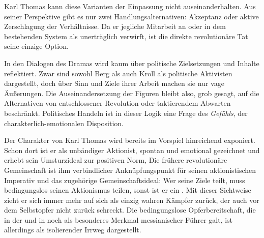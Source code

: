 Karl Thomas kann diese Varianten der Einpassung nicht
auseinanderhalten.  
Aus seiner Perspektive gibt es nur zwei Handlungsalternativen: Akzeptanz oder
aktive Zerschlagung der Verhältnisse. Da
er jegliche Mitarbeit an oder in dem bestehenden System als unerträglich
verwirft, ist die direkte revolutionäre Tat seine einzige Option.

In den Dialogen des Dramas wird kaum über politische Zielsetzungen und Inhalte
reflektiert. Zwar sind sowohl Berg als auch Kroll als politische Aktivisten
dargestellt, doch über Sinn und Ziele ihrer Arbeit machen sie nur vage
Äußerungen.
Die Auseinandersetzung der Figuren bleibt
also, grob gesagt, auf die Alternativen von entschlossener Revolution oder
taktierendem Abwarten beschränkt. Politisches Handeln ist in dieser Logik eine
Frage des \emph{Gefühls}, der charakterlich-emotionalen
Disposition.

Der Charakter von Karl Thomas wird bereits im Vorspiel hinreichend
exponiert. Schon dort ist er als unbändiger Aktionist, spontan und emotional
gezeichnet
und erhebt sein Umsturzideal zur positiven Norm,  
Die frühere revolutionäre Gemeinschaft ist ihm verbindlicher
Anknüpfungspunkt für seinen aktionistischen Imperativ und das
zugehörige Gemeinschaftsideal: Wer seine Ziele teilt, muss
bedingungslos seinen Aktionismus teilen, sonst ist er ein \Cite{Feigling}
. Mit dieser Sichtweise zieht er sich immer mehr auf sich
als einzig wahren Kämpfer zurück, der auch vor dem Selbstopfer nicht zurück
schreckt.
Die bedingungslose Opferbereitschaft, die in der  und in
 noch als besonderes Merkmal messianischer Führer galt,
ist allerdings als isolierender Irrweg dargestellt.  

